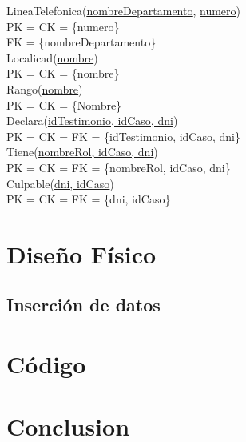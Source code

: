 \documentclass[10pt,a4paper]{article}
\begin{document}
\newline
LineaTelefonica(\underline{\underline{nombreDepartamento}}, \underline{numero})\\ 
	PK = CK = \{numero\}\\ 
	FK = \{nombreDepartamento\}\\
\newline
Localicad(\underline{nombre})\\ 
	PK = CK = \{nombre\}\\ 
\newline
Rango(\underline{nombre})\\ 
	PK = CK = \{Nombre\}\\ 
\newline
Declara(\underline{\underline{idTestimonio, idCaso, dni}})\\ 
	PK = CK = FK = \{idTestimonio, idCaso, dni\}\\
\newline
Tiene(\underline{\underline{nombreRol, idCaso, dni}})\\ 
	PK = CK = FK = \{nombreRol, idCaso, dni\}\\ 
\newline
Culpable(\underline{\underline{dni, idCaso}})\\ 
	PK = CK = FK = \{dni, idCaso\}\\ 

\section{Diseño Físico}

\subsection{Inserción de datos}

\section{Código}

\section{Conclusion}
\end{document}
